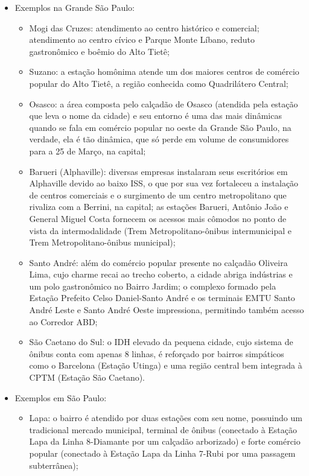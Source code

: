 \documentclass[11pt,fleqn]{book} %
\begin{document}
\begin{itemize}
	\item Exemplos na Grande São Paulo:
		\begin{itemize}
			\item Mogi das Cruzes: atendimento ao centro histórico e comercial; atendimento ao centro cívico e Parque Monte Líbano, reduto gastronômico e boêmio do Alto Tietê;
			\item Suzano: a estação homônima atende um dos maiores centros de comércio popular do Alto Tietê, a região conhecida como Quadrilátero Central;
			\item Osasco: a área composta pelo calçadão de Osasco (atendida pela estação que leva o nome da cidade) e seu entorno é uma das mais dinâmicas quando se fala em comércio popular no oeste da Grande São Paulo, na verdade, ela é tão dinâmica, que só perde em volume de consumidores para a 25 de Março, na capital;
			\item Barueri (Alphaville): diversas empresas instalaram seus escritórios em Alphaville devido ao baixo ISS, o que por sua vez fortaleceu a instalação de centros comerciais e o surgimento de um centro metropolitano que rivaliza com a Berrini, na capital; as estações Barueri, Antônio João e General Miguel Costa fornecem os acessos mais cômodos no ponto de vista da intermodalidade (Trem Metropolitano-ônibus intermunicipal e Trem Metropolitano-ônibus municipal);
			\item Santo André: além do comércio popular presente no calçadão Oliveira Lima, cujo charme recai ao trecho coberto, a cidade abriga indústrias e um polo gastronômico no Bairro Jardim; o complexo formado pela Estação Prefeito Celso Daniel-Santo André e os terminais EMTU Santo André Leste e Santo André Oeste impressiona, permitindo também acesso ao Corredor ABD;
			\item São Caetano do Sul: o IDH elevado da pequena cidade, cujo sistema de ônibus conta com apenas 8 linhas, é reforçado por bairros simpáticos como o Barcelona (Estação Utinga) e uma região central bem integrada à CPTM (Estação São Caetano).
		\end{itemize}
	\item Exemplos em São Paulo:
		\begin{itemize}
			\item Lapa: o bairro é atendido por duas estações com seu nome, possuindo um tradicional mercado municipal, terminal de ônibus (conectado à Estação Lapa da Linha 8-Diamante por um calçadão arborizado) e forte comércio popular (conectado à Estação Lapa da Linha 7-Rubi por uma passagem subterrânea);

\end{itemize}
\end{itemize}
\end{document}
